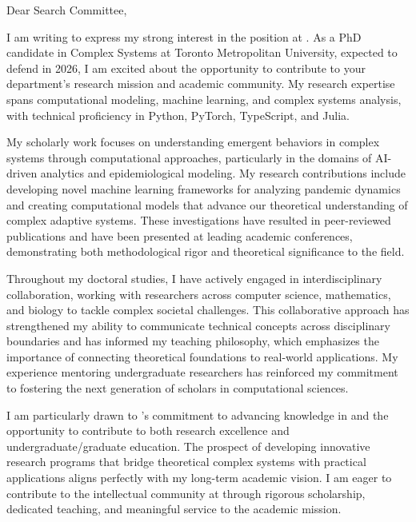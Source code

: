 \vspace{-6em}
Dear \company{} Search Committee,
\vspace{1.0em}

\hspace{1.5em} I am writing to express my strong interest in the \position{} position at \company. As a PhD candidate in Complex Systems at Toronto Metropolitan University, expected to defend in 2026, I am excited about the opportunity to contribute to your department's research mission and academic community. My research expertise spans computational modeling, machine learning, and complex systems analysis, with technical proficiency in Python, PyTorch, TypeScript, and Julia.
\vspace{1.0em}

\hspace{1.5em} My scholarly work focuses on understanding emergent behaviors in complex systems through computational approaches, particularly in the domains of AI-driven analytics and epidemiological modeling. My research contributions include developing novel machine learning frameworks for analyzing pandemic dynamics and creating computational models that advance our theoretical understanding of complex adaptive systems. These investigations have resulted in peer-reviewed publications and have been presented at leading academic conferences, demonstrating both methodological rigor and theoretical significance to the field.
\vspace{1.0em}

\hspace{1.5em} Throughout my doctoral studies, I have actively engaged in interdisciplinary collaboration, working with researchers across computer science, mathematics, and biology to tackle complex societal challenges. This collaborative approach has strengthened my ability to communicate technical concepts across disciplinary boundaries and has informed my teaching philosophy, which emphasizes the importance of connecting theoretical foundations to real-world applications. My experience mentoring undergraduate researchers has reinforced my commitment to fostering the next generation of scholars in computational sciences.
\vspace{1.0em}

\hspace{1.5em} I am particularly drawn to \company's commitment to advancing knowledge in \team{} and the opportunity to contribute to both research excellence and undergraduate/graduate education. The prospect of developing innovative research programs that bridge theoretical complex systems with practical applications aligns perfectly with my long-term academic vision. I am eager to contribute to the intellectual community at \company{} through rigorous scholarship, dedicated teaching, and meaningful service to the academic mission.
\vspace{1.0em}

